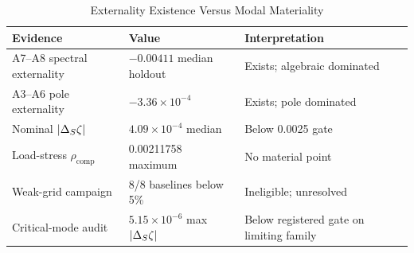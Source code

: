 \begin{table}[t]
\caption{Externality Existence Versus Modal Materiality}
\label{tab:materiality}
\centering
\footnotesize
\begin{tabular}{p{}p{}p{}}
\toprule
Evidence & Value & Interpretation\\
\midrule
A7--A8 spectral externality & $-0.00411$ median holdout & Exists; algebraic dominated\\
A3--A6 pole externality & $-3.36\times10^{-4}$ & Exists; pole dominated\\
Nominal $|\Delta_{S}\zeta|$ & $4.09\times10^{-4}$ median & Below 0.0025 gate\\
Load-stress $\rho_{\mathrm{comp}}$ & 0.00211758 maximum & No material point\\
Weak-grid campaign & 8/8 baselines below 5\% & Ineligible; unresolved\\
Critical-mode audit & $5.15\times10^{-6}$ max $|\Delta_{S}\zeta|$ & Below registered gate on limiting family\\
\bottomrule
\end{tabular}
\end{table}
